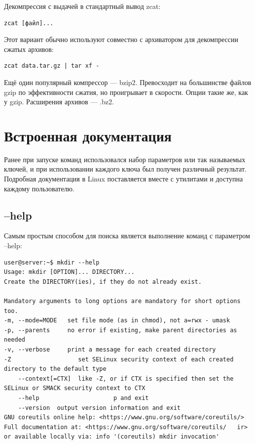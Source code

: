 \documentclass[14pt, a4paper]{article}
\begin{document}
Декомпрессия с выдачей в стандартный вывод zcat:

\begin{lstlisting}
zcat [файл]...
\end{lstlisting}

Этот вариант обычно используют совместно с архиватором для декомпрессии сжатых
архивов:

\begin{lstlisting}
zcat data.tar.gz | tar xf -
\end{lstlisting}

Ещё один популярный компрессор — bzip2. Превосходит на большинстве файлов gzip по
эффективности сжатия, но проигрывает в скорости. Опции такие же, как у gzip. Расширения
архивов — .bz2.



\section*{Встроенная документация}

Ранее при запуске команд использовался набор параметров или так называемых ключей, и
при использовании каждого ключа был получен различный результат. Подробная документация в
Linux поставляется вместе с утилитами и доступна каждому пользователю.



\subsection*{--help}

Самым простым способом для поиска является выполнение команд с параметром --help:

\begin{lstlisting}
user@server:~$ mkdir --help
Usage: mkdir [OPTION]... DIRECTORY...
Create the DIRECTORY(ies), if they do not already exist.

Mandatory arguments to long options are mandatory for short options too.
-m, --mode=MODE   set file mode (as in chmod), not a=rwx - umask
-p, --parents     no error if existing, make parent directories as needed
-v, --verbose     print a message for each created directory
-Z                   set SELinux security context of each created directory to the default type
    --context[=CTX]  like -Z, or if CTX is specified then set the SELinux or SMACK security context to CTX
    --help                     p and exit
    --version  output version information and exit
GNU coreutils online help: <https://www.gnu.org/software/coreutils/> Full documentation at: <https://www.gnu.org/software/coreutils/   ir> or available locally via: info '(coreutils) mkdir invocation'
\end{lstlisting}
\end{document}
